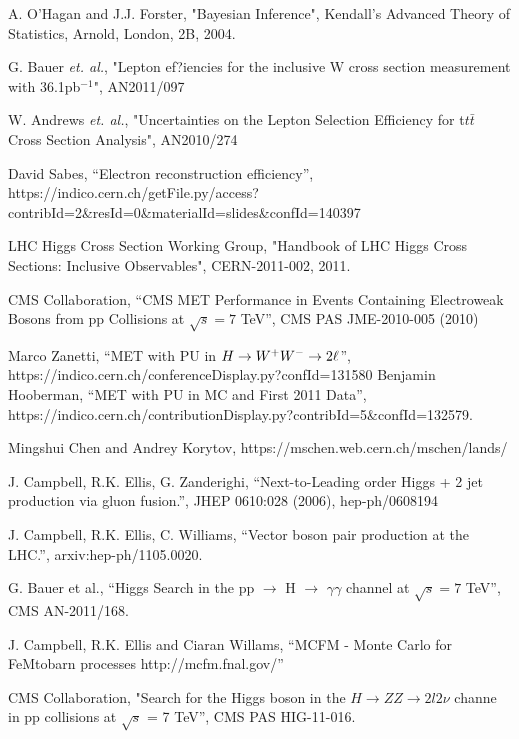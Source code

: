 A. O'Hagan and J.J. Forster, "Bayesian Inference", Kendall's Advanced Theory of Statistics, 
Arnold, London, 2B, 2004.

G. Bauer {\it et. al.}, "Lepton ef?iencies for the inclusive W cross section measurement with 36.1pb$^{-1}$", AN2011/097

W. Andrews {\it et. al.}, "Uncertainties on the Lepton Selection Efficiency for t$t\bar{t}$ Cross Section Analysis", AN2010/274

David Sabes, ``Electron reconstruction efficiency'', https://indico.cern.ch/getFile.py/access?contribId=2\&resId=0\&materialId=slides\&confId=140397

LHC Higgs Cross Section Working Group, "Handbook of LHC Higgs Cross Sections: 
Inclusive Observables", CERN-2011-002, 2011.

CMS Collaboration, ``CMS MET Performance in Events Containing Electroweak Bosons from pp Collisions at $\sqrt{s}=7$ TeV'', CMS PAS JME-2010-005 (2010)


Marco Zanetti, ``MET with PU in $H\to W^+W^-\to2\ell$'', https://indico.cern.ch/conferenceDisplay.py?confId=131580
Benjamin Hooberman, ``MET with PU in MC and First 2011 Data'', https://indico.cern.ch/contributionDisplay.py?contribId=5\&confId=132579. 


Mingshui Chen and Andrey Korytov, https://mschen.web.cern.ch/mschen/lands/

J. Campbell, R.K. Ellis, G. Zanderighi, ``Next-to-Leading order Higgs + 2 jet production via gluon fusion.'', JHEP 0610:028 (2006), hep-ph/0608194

J. Campbell, R.K. Ellis, C. Williams, ``Vector boson pair production at the LHC.'', arxiv:hep-ph/1105.0020.

G. Bauer et al., ``Higgs Search in the pp $\rightarrow$ H $\rightarrow$ $\gamma\gamma$ channel at $\sqrt{s}=7$ TeV'', CMS AN-2011/168. 

J. Campbell, R.K. Ellis and Ciaran Willams, ``MCFM - Monte Carlo for FeMtobarn processes http://mcfm.fnal.gov/''

CMS Collaboration, "Search for the Higgs boson in the $H\to ZZ\to 2l2\nu$ 
channe in pp collisions at $\sqrt{s}$ = 7 TeV'', CMS PAS HIG-11-016.

